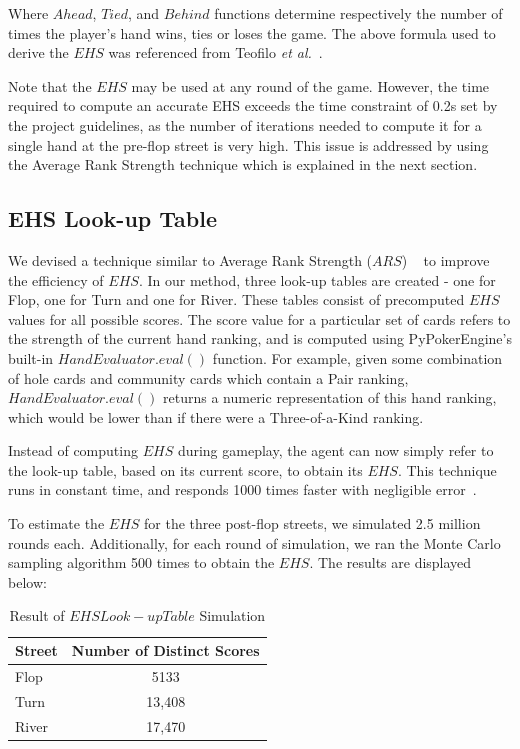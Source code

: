 \documentclass{article}
\begin{document}
\noindent Where $Ahead$, $Tied$, and $Behind$ functions determine respectively the number of times the player's hand wins, ties or loses the game. The above formula used to derive the $EHS$ was referenced from Teofilo \textit{et al.}~. 

Note that the $EHS$ may be used at any round of the game. However, the time required to compute an accurate EHS exceeds the time constraint of 0.2s set by the project guidelines, as the number of iterations needed to compute it for a single hand at the pre-flop street is very high. This issue is addressed by using the Average Rank Strength technique which is explained in the next section.

\subsection{EHS Look-up Table}

We devised a technique similar to Average Rank Strength ($ARS$) ~\cite{trc:ars} to improve the efficiency of $EHS$. In our method, three look-up tables are created - one for Flop, one for Turn and one for River. These tables consist of precomputed $EHS$ values for all possible scores. The score value for a particular set of cards refers to the strength of the current hand ranking, and is computed using PyPokerEngine's built-in $HandEvaluator.eval()$ function. For example, given some combination of hole cards and community cards which contain a Pair ranking, $HandEvaluator.eval()$ returns a numeric representation of this hand ranking, which would be lower than if there were a Three-of-a-Kind ranking. 

Instead of computing $EHS$ during gameplay, the agent can now simply refer to the look-up table, based on its current score, to obtain its $EHS$. This technique runs in constant time, and responds 1000 times faster with negligible error~\cite{trc:ars}.

To estimate the $EHS$ for the three post-flop streets, we simulated 2.5 million rounds each. Additionally, for each round of simulation, we ran the Monte Carlo sampling algorithm 500 times to obtain the $EHS$. The results are displayed below:

\begin{table}[h!]
  \begin{center}
    \begin{tabular}{l|c}
      \textbf{Street} & \textbf{Number of Distinct Scores} \\
      \hline
      Flop & 5133 \\
      Turn & 13,408 \\
      River & 17,470 \\
    \end{tabular}
    \caption{Result of $EHS Look-up Table$ Simulation}
    \label{tab:table2}
  \end{center}
\end{table}
\end{document}
